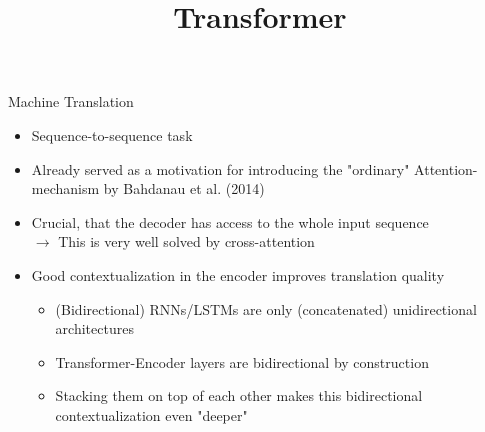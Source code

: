 



\newcommand{\titlefigure}{figure/transformer_sq.png}
\newcommand{\learninggoals}{
\item Understand the use of the Transformer}

\title{Transformer}
\date{}




\begin{vbframe}{Machine Translation}

\vfill

\begin{itemize}
	\item Sequence-to-sequence task
	\item Already served as a motivation for introducing the "ordinary" Attention-mechanism by Bahdanau et al. (2014)
	\item Crucial, that the decoder has access to the whole input sequence \\
				$\to$ This is very well solved by cross-attention
	\item Good contextualization in the encoder improves translation quality
		\begin{itemize}
			\item (Bidirectional) RNNs/LSTMs are only (concatenated) unidirectional architectures
			\item Transformer-Encoder layers are bidirectional by construction
			\item Stacking them on top of each other makes this bidirectional contextualization even "deeper"
		\end{itemize}
\end{itemize}

\vfill

\end{vbframe}


